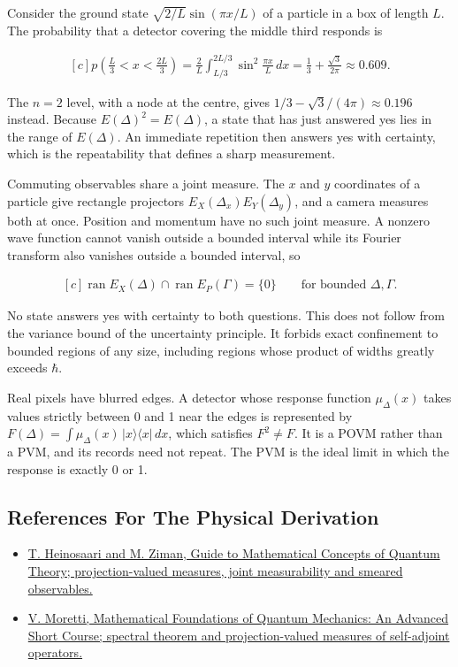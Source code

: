 \documentclass[11pt,oneside]{book}
\newenvironment{centeredalign}{\[\begin{gathered}[c]}{\end{gathered}\]}
\begin{document}
Consider the ground state \(\sqrt{2/L}\sin(\pi x/L)\) of a particle in a box of length \(L\). The probability that a detector covering the middle third responds is

\begin{centeredalign}
p\left(\tfrac{L}{3}<x<\tfrac{2L}{3}\right)=\frac{2}{L}\int_{L/3}^{2L/3}\sin^2\frac{\pi x}{L}\,dx
=\frac13+\frac{\sqrt3}{2\pi}\approx0.609.
\end{centeredalign}

The \(n=2\) level, with a node at the centre, gives \(1/3-\sqrt3/(4\pi)\approx0.196\) instead. Because \(E(\Delta)^2=E(\Delta)\), a state that has just answered yes lies in the range of \(E(\Delta)\). An immediate repetition then answers yes with certainty, which is the repeatability that defines a sharp measurement.

Commuting observables share a joint measure. The \(x\) and \(y\) coordinates of a particle give rectangle projectors \(E_X(\Delta_x)E_Y(\Delta_y)\), and a camera measures both at once. Position and momentum have no such joint measure. A nonzero wave function cannot vanish outside a bounded interval while its Fourier transform also vanishes outside a bounded interval, so

\begin{centeredalign}
\operatorname{ran}E_X(\Delta)\cap\operatorname{ran}E_P(\Gamma)=\{0\}
\qquad\text{for bounded }\Delta,\Gamma.
\end{centeredalign}

No state answers yes with certainty to both questions. This does not follow from the variance bound of the uncertainty principle. It forbids exact confinement to bounded regions of any size, including regions whose product of widths greatly exceeds \(\hbar\).

Real pixels have blurred edges. A detector whose response function \(\mu_\Delta(x)\) takes values strictly between 0 and 1 near the edges is represented by \(F(\Delta)=\int\mu_\Delta(x)\,|x\rangle\langle x|\,dx\), which satisfies \(F^2\neq F\). It is a POVM rather than a PVM, and its records need not repeat. The PVM is the ideal limit in which the response is exactly 0 or 1.

\subsection*{References For The Physical Derivation}
\begin{itemize}
\item \href{https://arxiv.org/abs/0810.3536}{T. Heinosaari and M. Ziman, Guide to Mathematical Concepts of Quantum Theory; projection-valued measures, joint measurability and smeared observables.}
\item \href{https://arxiv.org/abs/1508.06951}{V. Moretti, Mathematical Foundations of Quantum Mechanics: An Advanced Short Course; spectral theorem and projection-valued measures of self-adjoint operators.}
\end{itemize}
\end{document}
